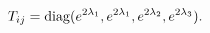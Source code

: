 \begin{equation}\label{scalars}
T_{ij} = {\rm diag}( e^{2\lambda_1},  e^{2\lambda_1},
e^{2\lambda_2},  e^{2\lambda_3}).
\end{equation}

